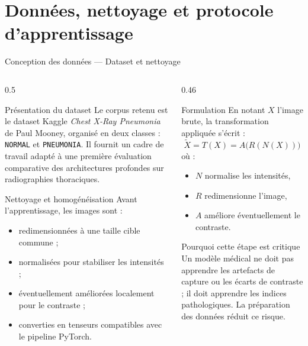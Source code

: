 \section{Données, nettoyage et protocole d'apprentissage}

\begin{frame}[t]{Conception des données --- Dataset et nettoyage}
\small
\begin{columns}[T,onlytextwidth]
\begin{column}{0.5\textwidth}
\begin{block}{Présentation du dataset}
Le corpus retenu est le dataset Kaggle \textit{Chest X-Ray Pneumonia} de Paul Mooney, organisé en deux classes : \texttt{NORMAL} et \texttt{PNEUMONIA}. Il fournit un cadre de travail adapté à une première évaluation comparative des architectures profondes sur radiographies thoraciques.
\end{block}
\begin{block}{Nettoyage et homogénéisation}
Avant l'apprentissage, les images sont :
\begin{itemize}
\item redimensionnées à une taille cible commune ;
\item normalisées pour stabiliser les intensités ;
\item éventuellement améliorées localement pour le contraste ;
\item converties en tenseurs compatibles avec le pipeline PyTorch.
\end{itemize}
\end{block}
\end{column}
\begin{column}{0.46\textwidth}
\begin{block}{Formulation}
En notant $X$ l'image brute, la transformation appliquée s'écrit :
\[
\tilde X = T(X)=A\big(R(N(X))\big)
\]
où :
\begin{itemize}
\item $N$ normalise les intensités,
\item $R$ redimensionne l'image,
\item $A$ améliore éventuellement le contraste.
\end{itemize}
\end{block}
\begin{alertblock}{Pourquoi cette étape est critique}
Un modèle médical ne doit pas apprendre les artefacts de capture ou les écarts de contraste ; il doit apprendre les indices pathologiques. La préparation des données réduit ce risque.
\end{alertblock}
\end{column}
\end{columns}
\end{frame}

